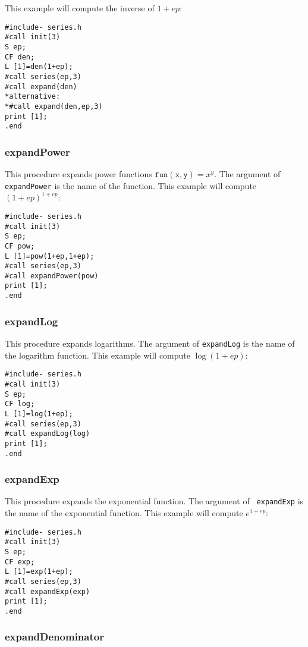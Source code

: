 \documentclass{article}
\begin{document}
This example will compute the
inverse of $1+ep$:
\begin{verbatim}
#include- series.h
#call init(3)
S ep;
CF den;
L [1]=den(1+ep);
#call series(ep,3)
#call expand(den)
*alternative:
*#call expand(den,ep,3)
print [1];
.end
\end{verbatim}

\subsubsection{expandPower}
\label{sec:pow_fun}

This procedure expands power functions $\mathtt{fun(x,y)} = x^y$. The
argument of {\tt expandPower} is the name of the function. This example
will compute $(1+ep)^{1+ep}$:
\begin{verbatim}
#include- series.h
#call init(3)
S ep;
CF pow;
L [1]=pow(1+ep,1+ep);
#call series(ep,3)
#call expandPower(pow)
print [1];
.end
\end{verbatim}

\subsubsection{expandLog}
\label{sec:log_fun}

This procedure expands logarithms. The argument of {\tt expandLog} is the name of the
logarithm function. This example will compute $\log(1+ep)$:
\begin{verbatim}
#include- series.h
#call init(3)
S ep;
CF log;
L [1]=log(1+ep);
#call series(ep,3)
#call expandLog(log)
print [1];
.end
\end{verbatim}

\subsubsection{expandExp}
\label{sec:exp_fun}

This procedure expands the exponential function. The argument of {\tt
expandExp} is the name of the exponential function. This example will
compute $e^{1+ep}$:
\begin{verbatim}
#include- series.h
#call init(3)
S ep;
CF exp;
L [1]=exp(1+ep);
#call series(ep,3)
#call expandExp(exp)
print [1];
.end
\end{verbatim}

\subsubsection{expandDenominator}
\label{sec:inv_fun}
\end{document}
